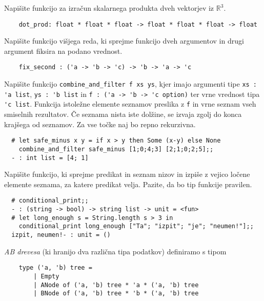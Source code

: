 \documentclass[arhiv]{../izpit}
\begin{document}
	
	

	\naloga 
  
	\podnaloga Napišite funkcijo za izračun skalarnega produkta dveh vektorjev iz $\mathbb{R}^3$.
  \begin{verbatim}
    dot_prod: float * float * float -> float * float * float -> float
  \end{verbatim}

  \podnaloga Napišite funkcijo višjega reda, ki sprejme funkcijo dveh argumentov in drugi argument fiksira na podano vrednost. 
  \begin{verbatim}
    fix_second : ('a -> 'b -> 'c) -> 'b -> 'a -> 'c
  \end{verbatim}

	\podnaloga Napišite funkcijo \verb|combine_and_filter f xs ys|, kjer imajo argumenti tipe \verb|xs : 'a list|, \verb|ys : 'b list| in \verb|f : ('a -> 'b -> 'c option)| ter vrne vrednost tipa \verb|'c list|. Funkcija istoležne elemente seznamov preslika z \verb|f| in vrne seznam vseh smiselnih rezultatov. Če seznama nista iste dolžine, se izvaja zgolj do konca krajšega od seznamov. Za vse točke naj bo repno rekurzivna.
	\begin{verbatim}
  # let safe_minus x y = if x > y then Some (x-y) else None
    combine_and_filter safe_minus [1;0;4;3] [2;1;0;2;5];;
  - : int list = [4; 1]
	\end{verbatim}
	
	\podnaloga Napišite funkcijo, ki sprejme predikat in seznam nizov in izpiše z vejico ločene elemente seznama, za katere predikat velja. Pazite, da bo tip funkcije pravilen.
  \begin{verbatim}
  # conditional_print;;
  - : (string -> bool) -> string list -> unit = <fun>
  # let long_enough s = String.length s > 3 in
    conditional_print long_enough ["Ta"; "izpit"; "je"; "neumen!"];;
  izpit, neumen!- : unit = ()
	\end{verbatim}
  
  \naloga
  
  \textit{AB drevesa} (ki hranijo dva različna tipa podatkov) definiramo s tipom
  	\begin{verbatim}
  	type ('a, 'b) tree = 
  		| Empty
  		| ANode of ('a, 'b) tree * 'a * ('a, 'b) tree
  		| BNode of ('a, 'b) tree * 'b * ('a, 'b) tree
  	\end{verbatim}
  
\end{document}

